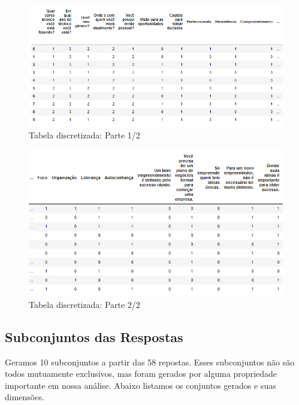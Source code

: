 \begin{figure}[!h]
    \centering
    \includegraphics[width=1.0\textwidth]{img/dataFrameConverter1.PNG}
    \caption{Tabela discretizada: Parte 1/2}
    \label{fig:tableC1}
\end{figure}

\begin{figure}[!h]
    \centering
    \includegraphics[width=1.0\textwidth]{img/dataFrameConverter2.PNG}
    \caption{Tabela discretizada: Parte 2/2}
    \label{fig:tableC2}
\end{figure}

\subsection{Subconjuntos das Respostas}
Geramos 10 subconjuntos a partir das 58 repostas. Esses subconjuntos não são todos mutuamente exclusivos, mas foram gerados por alguma propriedade importante em nossa análise. Abaixo listamos os conjuntos gerados e suas dimensões.


